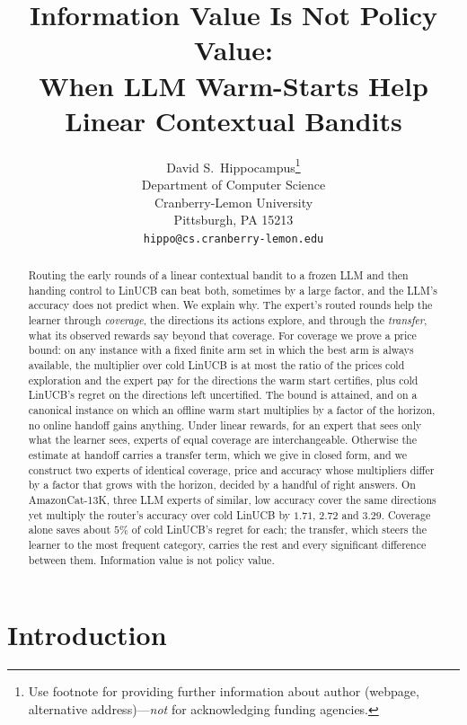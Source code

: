 \documentclass{article}
\title{Information Value Is Not Policy Value:\\ When LLM Warm-Starts Help Linear Contextual Bandits}
\author{%
  David S.~Hippocampus\thanks{Use footnote for providing further information
    about author (webpage, alternative address)---\emph{not} for acknowledging
    funding agencies.} \\
  Department of Computer Science\\
  Cranberry-Lemon University\\
  Pittsburgh, PA 15213 \\
  \texttt{hippo@cs.cranberry-lemon.edu} \\
}
\theoremstyle{definition}
\theoremstyle{remark}
\theoremstyle{remark}
\begin{document}
\maketitle
\begin{abstract}
Routing the early rounds of a linear contextual bandit to a frozen LLM and
then handing control to LinUCB can beat both, sometimes by a large factor,
and the LLM's accuracy does not predict when. We explain why. The expert's
routed rounds help the learner through \emph{coverage}, the directions its
actions explore, and through the \emph{transfer}, what its observed rewards
say beyond that coverage. For coverage we prove a price bound: on any
instance with a fixed finite arm set in which the best arm is always
available, the multiplier over cold LinUCB is at most the ratio of the prices
cold exploration and the expert pay for the directions the warm start
certifies, plus cold LinUCB's regret on the directions left uncertified. The
bound is attained, and on a canonical instance on which an offline warm start
multiplies by a factor of the horizon, no online handoff gains anything.
Under linear rewards, for an expert that sees only what the learner sees,
experts of equal coverage are interchangeable. Otherwise the estimate at
handoff carries a transfer term, which we give in closed form, and we
construct two experts of identical coverage, price and accuracy whose
multipliers differ by a factor that grows with the horizon, decided by a
handful of right answers. On AmazonCat-13K, three LLM experts of similar, low
accuracy cover the same directions yet multiply the router's accuracy over
cold LinUCB by $1.71$, $2.72$ and $3.29$. Coverage alone saves about $5\%$ of
cold LinUCB's regret for each; the transfer, which steers the learner to the
most frequent category, carries the rest and every significant difference
between them. Information value is not policy value.
\end{abstract}


\section{Introduction}
\label{sec:intro}
\end{document}
